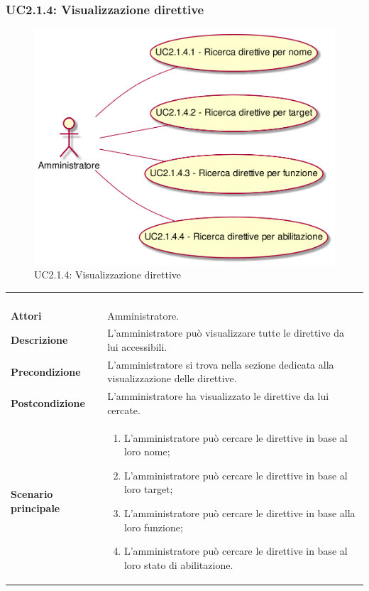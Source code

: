 \newpage\subsubsection{UC2.1.4: Visualizzazione direttive }
\label{UC2.1.4}
\begin{figure}[h]
\centering
\includegraphics[width=\textwidth,height=\textheight,keepaspectratio]{images/UseCaseUC214.png}
\caption{UC2.1.4: Visualizzazione direttive }
\end{figure}
\begin{longtable}{l|p{10cm}}
\rowcolor[gray]{0.8} \multicolumn{2}{c}{} \\
\rowcolor[gray]{0.8} \multicolumn{2}{c}{\textbf{UC2.1.4 - Visualizzazione direttive }} \\
\rowcolor[gray]{0.8} \multicolumn{2}{c}{} \\
\hline
&\\
\textbf{Attori} & Amministratore.\\[7pt]
\textbf{Descrizione} & L'amministratore può visualizzare tutte le direttive da lui accessibili.\\[7pt]
\textbf{Precondizione} & L'amministratore si trova nella sezione dedicata alla visualizzazione delle direttive.\\[7pt]
\textbf{Postcondizione} & L'amministratore ha visualizzato le direttive da lui cercate.\\[7pt]
\textbf{Scenario principale} &\begin{enumerate}
\item  L'amministratore può cercare le direttive in base al loro nome;
\item  L'amministratore può cercare le direttive in base al loro target;
\item  L'amministratore può cercare le direttive in base alla loro funzione;
\item  L'amministratore può cercare le direttive in base al loro stato di abilitazione.
\end{enumerate}
\\[7pt]\hline
\end{longtable}

